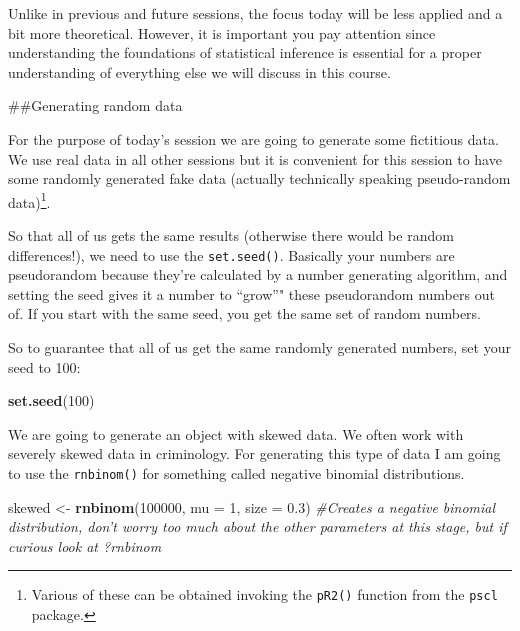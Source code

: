 \documentclass[]{book}
\newenvironment{Shaded}{\begin{snugshade}}{\end{snugshade}}
\newcommand{\CommentTok}[1]{\textcolor[rgb]{0.56,0.35,0.01}{\textit{#1}}}
\newcommand{\DataTypeTok}[1]{\textcolor[rgb]{0.13,0.29,0.53}{#1}}
\newcommand{\DecValTok}[1]{\textcolor[rgb]{0.00,0.00,0.81}{#1}}
\newcommand{\FloatTok}[1]{\textcolor[rgb]{0.00,0.00,0.81}{#1}}
\newcommand{\KeywordTok}[1]{\textcolor[rgb]{0.13,0.29,0.53}{\textbf{#1}}}
\newcommand{\NormalTok}[1]{#1}
\newcommand{\StringTok}[1]{\textcolor[rgb]{0.31,0.60,0.02}{#1}}
\let\rmarkdownfootnote\footnote%
\def\footnote{\protect\rmarkdownfootnote}
\theoremstyle{definition}
\theoremstyle{definition}
\theoremstyle{definition}
\theoremstyle{remark}
\begin{document}
Unlike in previous and future sessions, the focus today will be less
applied and a bit more theoretical. However, it is important you pay
attention since understanding the foundations of statistical inference
is essential for a proper understanding of everything else we will
discuss in this course.

\#\#Generating random data

For the purpose of today's session we are going to generate some
fictitious data. We use real data in all other sessions but it is
convenient for this session to have some randomly generated fake data
(actually technically speaking pseudo-random data)\footnote{Various of
  these can be obtained invoking the \texttt{pR2()} function from the
  \texttt{pscl} package.}.

So that all of us gets the same results (otherwise there would be random
differences!), we need to use the \texttt{set.seed()}. Basically your
numbers are pseudorandom because they're calculated by a number
generating algorithm, and setting the seed gives it a number to
``grow''" these pseudorandom numbers out of. If you start with the same
seed, you get the same set of random numbers.

So to guarantee that all of us get the same randomly generated numbers,
set your seed to 100:

\begin{Shaded}
\begin{Highlighting}[]
\KeywordTok{set.seed}\NormalTok{(}\DecValTok{100}\NormalTok{) }
\end{Highlighting}
\end{Shaded}

We are going to generate an object with skewed data. We often work with
severely skewed data in criminology. For generating this type of data I
am going to use the \texttt{rnbinom()} for something called negative
binomial distributions.

\begin{Shaded}
\begin{Highlighting}[]
\NormalTok{skewed <-}\StringTok{ }\KeywordTok{rnbinom}\NormalTok{(}\DecValTok{100000}\NormalTok{, }\DataTypeTok{mu =} \DecValTok{1}\NormalTok{, }\DataTypeTok{size =} \FloatTok{0.3}\NormalTok{) }\CommentTok{#Creates a negative binomial distribution, don't worry too much about the other parameters at this stage, but if curious look at ?rnbinom}
\end{Highlighting}
\end{Shaded}
\end{document}
